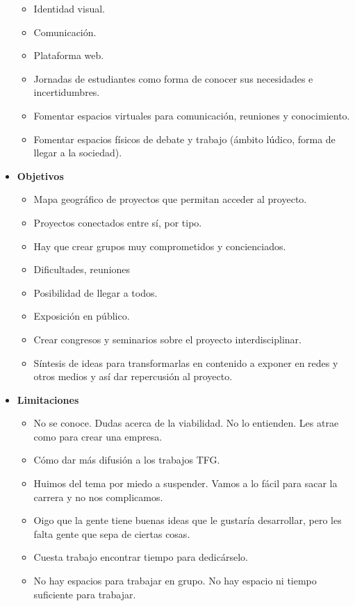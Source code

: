 \begin{itemize}
    \begin{itemize}
        \item Identidad visual.
        \item Comunicación.
        \item Plataforma web.
        \item Jornadas de estudiantes como forma de conocer sus necesidades e incertidumbres.
        \item Fomentar espacios virtuales para comunicación, reuniones y conocimiento.
        \item Fomentar espacios físicos de debate y trabajo (ámbito lúdico, forma de llegar a la sociedad).
    \end{itemize}
    \item \textbf{Objetivos}
    \begin{itemize}
        \item Mapa geográfico de proyectos que permitan acceder al proyecto.
        \item Proyectos conectados entre sí, por tipo.
        \item Hay que crear grupos muy comprometidos y concienciados.
        \item Dificultades, reuniones
        \item Posibilidad de llegar a todos.
        \item Exposición en público.
        \item Crear congresos y seminarios sobre el proyecto interdisciplinar.
        \item Síntesis de ideas para transformarlas en contenido a exponer en redes y otros medios y así dar repercusión al proyecto.
    \end{itemize}
    \item \textbf{Limitaciones}
    \begin{itemize}
        \item No se conoce. Dudas acerca de la viabilidad. No lo entienden. Les atrae como para crear una empresa.
        \item Cómo dar más difusión a los trabajos TFG.
        \item Huimos del tema por miedo a suspender. Vamos a lo fácil para sacar la carrera y no nos complicamos.
        \item Oigo que la gente tiene buenas ideas que le gustaría desarrollar, pero les falta gente que sepa de ciertas cosas.
        \item Cuesta trabajo encontrar tiempo para dedicárselo.
        \item No hay espacios para trabajar en grupo. No hay espacio ni tiempo suficiente para trabajar.

\end{itemize}
\end{itemize}
